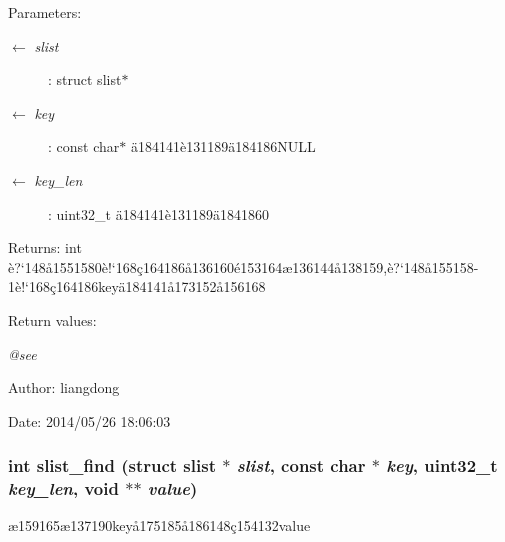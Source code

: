 \begin{Desc}
\item[Parameters:]
\begin{description}
\item[\mbox{$\leftarrow$} {\em slist}]: struct slist$\ast$ \item[\mbox{$\leftarrow$} {\em key}]: const char$\ast$ \"{a}184141\`{e}131189\"{a}184186NULL \item[\mbox{$\leftarrow$} {\em key\_\-len}]: uint32\_\-t \"{a}184141\`{e}131189\"{a}1841860 \end{description}
\end{Desc}
\begin{Desc}
\item[Returns:]int \`{e}?`148\aa{}1551580\`{e}!`168\c{c}164186\aa{}136160\'{e}153164\ae{}136144\aa{}138159,\`{e}?`148\aa{}155158-1\`{e}!`168\c{c}164186key\"{a}184141\aa{}173152\aa{}156168 \end{Desc}
\begin{Desc}
\item[Return values:]
\begin{description}
\item[{\em @see}]\end{description}
\end{Desc}
\begin{Desc}
\item[Author:]liangdong \end{Desc}
\begin{Desc}
\item[Date:]2014/05/26 18:06:03 \end{Desc}
\subsubsection{\setlength{\rightskip}{0pt plus 5cm}int slist\_\-find (struct slist $\ast$ {\em slist}, const char $\ast$ {\em key}, uint32\_\-t {\em key\_\-len}, void $\ast$$\ast$ {\em value})}\label{slist_8c_a11}


\ae{}159165\ae{}137190key\aa{}175185\aa{}186148\c{c}154132value 

